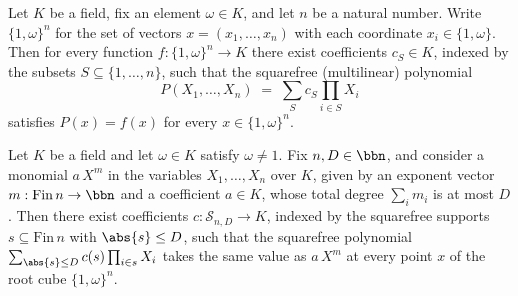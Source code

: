 \begin{theorem}
\label{RazborovSmolensky.exists_squarefree_representative_on_rootCube}
\leanok
{}
Let $K$ be a field, fix an element $\omega \in K$, and let $n$ be a natural number.
Write $\{1,\omega\}^n$ for the set of vectors $x = (x_1,\dots,x_n)$ with each coordinate
$x_i \in \{1,\omega\}$. Then for every function $f : \{1,\omega\}^n \to K$ there exist
coefficients $c_S \in K$, indexed by the subsets $S \subseteq \{1,\dots,n\}$, such that
the squarefree (multilinear) polynomial
\[
  P(X_1,\dots,X_n) \;=\; \sum_{S} c_S \prod_{i \in S} X_i
\]
satisfies $P(x) = f(x)$ for every $x \in \{1,\omega\}^n$.
\end{theorem}

\begin{theorem}
\label{RazborovSmolensky.monomial_lowDegree_squarefree_complete_on_rootCube}
\leanok
{}
Let $K$ be a field and let $\omega \in K$ satisfy $\omega \ne 1$. Fix $n, D \in \bbn$,
and consider a monomial $a\,X^m$ in the variables $X_1,\dots,X_n$ over $K$, given by an
exponent vector $m : \mathrm{Fin}\,n \to \bbn$ and a coefficient $a \in K$, whose total
degree $\sum_i m_i$ is at most $D$. Then there exist coefficients $c : \mathcal{S}_{n,D}
\to K$, indexed by the squarefree supports $s \subseteq \mathrm{Fin}\,n$ with $\abs{s}
\le D$, such that the squarefree polynomial $\sum_{\abs{s} \le D} c(s)\prod_{i \in s}
X_i$ takes the same value as $a\,X^m$ at every point $x$ of the root cube
$\{1,\omega\}^n$.
\end{theorem}

